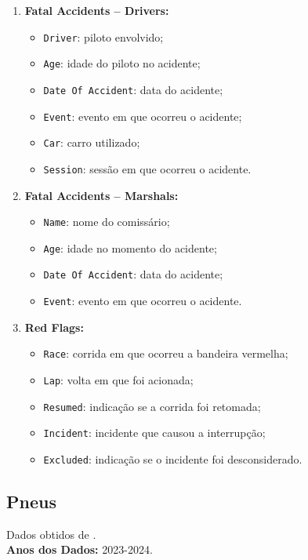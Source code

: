 \documentclass[12pt]{article}
\begin{document}
\begin{enumerate}
    \item \textbf{Fatal Accidents -- Drivers:}
    \begin{itemize}
        \item \texttt{Driver}: piloto envolvido;
        \item \texttt{Age}: idade do piloto no acidente;
        \item \texttt{Date Of Accident}: data do acidente;
        \item \texttt{Event}: evento em que ocorreu o acidente;
        \item \texttt{Car}: carro utilizado;
        \item \texttt{Session}: sessão em que ocorreu o acidente.
    \end{itemize}

    \item \textbf{Fatal Accidents -- Marshals:}
    \begin{itemize}
        \item \texttt{Name}: nome do comissário;
        \item \texttt{Age}: idade no momento do acidente;
        \item \texttt{Date Of Accident}: data do acidente;
        \item \texttt{Event}: evento em que ocorreu o acidente.
    \end{itemize}

    \item \textbf{Red Flags:}
    \begin{itemize}
        \item \texttt{Race}: corrida em que ocorreu a bandeira vermelha;
        \item \texttt{Lap}: volta em que foi acionada;
        \item \texttt{Resumed}: indicação se a corrida foi retomada;
        \item \texttt{Incident}: incidente que causou a interrupção;
        \item \texttt{Excluded}: indicação se o incidente foi desconsiderado.
    \end{itemize}
    
\end{enumerate}





\subsection{Pneus}
Dados obtidos de \cite{tyre_strategy_dataset}. \\
\textbf{Anos dos Dados:} 2023-2024.
\end{document}
